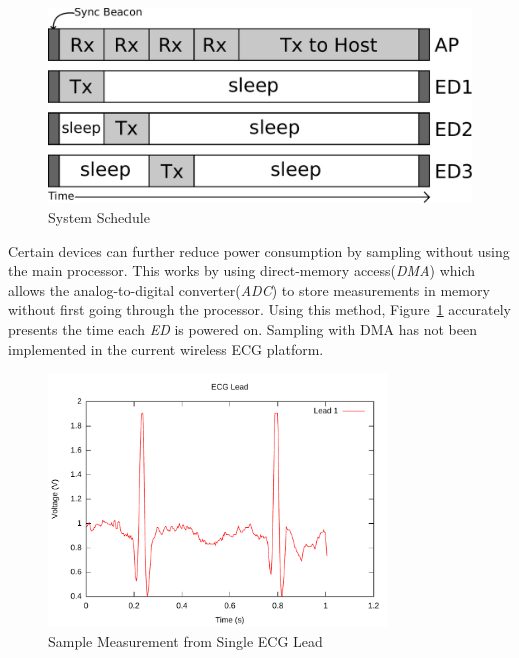 \documentclass{article}
\begin{document}
\begin{figure}[htb]
\begin{center}
\includegraphics[width=1\textwidth]{figures/sync_schedule.pdf}
\end{center}
\caption{System Schedule}
\label{fig:system_schedule}
\end{figure}

Certain devices can further reduce power consumption by sampling without using the main processor. This works by using direct-memory access(\emph{DMA}) which allows the analog-to-digital converter(\emph{ADC}) to store measurements in memory without first going through the processor. Using this method, Figure~\ref{fig:system_schedule} accurately presents the time each \emph{ED} is powered on. Sampling with DMA has not been implemented in the current wireless ECG platform.

\begin{figure}[htb]
\begin{center}
\includegraphics[width=0.8\textwidth]{figures/heartbeats.pdf}
\end{center}
\caption{Sample Measurement from Single ECG Lead}
\label{fig:heartbeats}
\end{figure}
\end{document}
